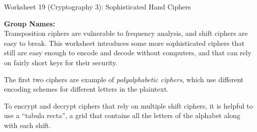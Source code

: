 \documentclass[12pt]{article}
\begin{document}
\begin{center}
{\Large  Worksheet 19 (Cryptography 3): Sophisticated Hand Ciphers}
\end{center}



\noindent \textbf{Group Names:} \hrulefill \\

Transposition ciphers are vulnerable to frequency analysis, and shift ciphers are easy to break. This worksheet introduces some more sophisticated ciphers that still are easy enough to encode and decode without computers, and that can rely on fairly short keys for their security.

The first two ciphers are example of \emph{polyalphabetic ciphers}, which use different encoding schemes for different letters in the plaintext. 

To encrypt and decrypt ciphers that rely on multiple shift ciphers, it is helpful to use a ``tabula recta'', a grid that contains all the letters of the alphabet along with each shift.
\end{document}
